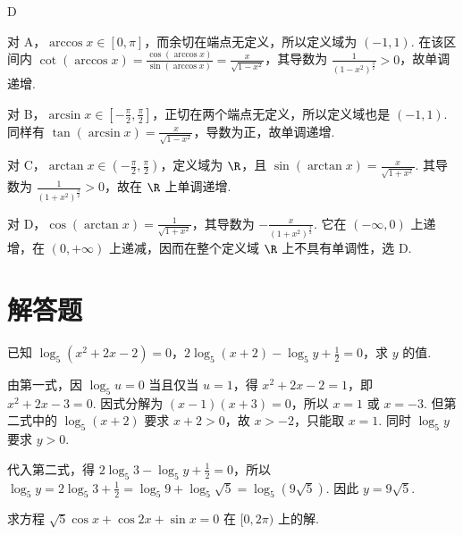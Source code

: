 \begin{answer}
D
\end{answer}

\begin{solution}
对 A，\(\arccos x\in[0,\pi]\)，而余切在端点无定义，所以定义域为 \((-1,1)\). 在该区间内
\(\cot(\arccos x)=\frac{\cos(\arccos x)}{\sin(\arccos x)}=\frac{x}{\sqrt{1-x^2}}\)，其导数为 \(\frac1{(1-x^2)^{\frac{3}{2}}}>0\)，故单调递增.

对 B，\(\arcsin x\in[-\frac\pi2,\frac\pi2]\)，正切在两个端点无定义，所以定义域也是 \((-1,1)\). 同样有 \(\tan(\arcsin x)=\frac{x}{\sqrt{1-x^2}}\)，导数为正，故单调递增.

对 C，\(\arctan x\in(-\frac\pi2,\frac\pi2)\)，定义域为 \(\R\)，且
\(\sin(\arctan x)=\frac{x}{\sqrt{1+x^2}}\). 其导数为 \(\frac1{(1+x^2)^{\frac{3}{2}}}>0\)，故在 \(\R\) 上单调递增.

对 D，\(\cos(\arctan x)=\frac1{\sqrt{1+x^2}}\)，其导数为 \(-\frac{x}{(1+x^2)^{\frac{3}{2}}}\). 它在 \((-\infty,0)\) 上递增，在 \((0,+\infty)\) 上递减，因而在整个定义域 \(\R\) 上不具有单调性，选 D.
\end{solution}

\section{解答题}

\begin{problem}
已知 \(\log_5(x^2+2x-2)=0\)，\(2\log_5(x+2)-\log_5 y+\frac{1}{2}=0\)，求 \(y\) 的值.
\end{problem}

\begin{solution}
由第一式，因 \(\log_5 u=0\) 当且仅当 \(u=1\)，得
\(x^2+2x-2=1\)，即 \(x^2+2x-3=0\). 因式分解为 \((x-1)(x+3)=0\)，所以 \(x=1\) 或 \(x=-3\). 但第二式中的 \(\log_5(x+2)\) 要求 \(x+2>0\)，故 \(x>-2\)，只能取 \(x=1\). 同时 \(\log_5 y\) 要求 \(y>0\).

代入第二式，得 \(2\log_5 3-\log_5 y+\frac12=0\)，所以
\(\log_5 y=2\log_5 3+\frac12=\log_5 9+\log_5\sqrt5=\log_5\left(9\sqrt5\right)\). 因此 \(y=9\sqrt5\).
\end{solution}

\begin{problem}
求方程 \(\sqrt{5}\cos x+\cos 2x+\sin x=0\) 在 \([0,2\pi)\) 上的解.
\end{problem}

